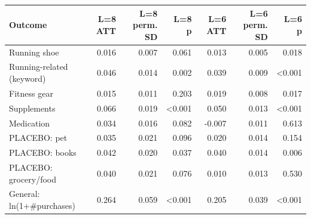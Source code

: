\begin{tabular}{lrrrrrr}
\toprule
Outcome & L=8 ATT & L=8 perm. SD & L=8 p & L=6 ATT & L=6 perm. SD & L=6 p \\
\midrule
Running shoe & 0.016 & 0.007 & 0.061 & 0.013 & 0.005 & 0.018 \\
Running-related (keyword) & 0.046 & 0.014 & 0.002 & 0.039 & 0.009 & <0.001 \\
Fitness gear & 0.015 & 0.011 & 0.203 & 0.019 & 0.008 & 0.017 \\
Supplements & 0.066 & 0.019 & <0.001 & 0.050 & 0.013 & <0.001 \\
Medication & 0.034 & 0.016 & 0.082 & -0.007 & 0.011 & 0.613 \\
PLACEBO: pet & 0.035 & 0.021 & 0.096 & 0.020 & 0.014 & 0.154 \\
PLACEBO: books & 0.042 & 0.020 & 0.037 & 0.040 & 0.014 & 0.006 \\
PLACEBO: grocery/food & 0.040 & 0.021 & 0.076 & 0.010 & 0.013 & 0.530 \\
General: ln(1+\#purchases) & 0.264 & 0.059 & <0.001 & 0.205 & 0.039 & <0.001 \\
\bottomrule
\end{tabular}
